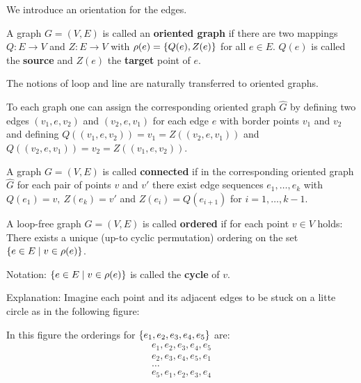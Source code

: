 We introduce an orientation for the edges. 

\begin{definition}
A graph $G = (V,E)$ is called an {\bf oriented graph} if there are two mappings
$Q : E \to V$ and $Z : E \to V$ with $\rho(e) = \mbox{$\{Q(e), Z(e)\}$}$ for all $e
\in E$.
$Q(e)$ is called the {\bf source} and $Z(e)$ the {\bf target} point of $e$.
\end{definition}


The notions of loop and line are naturally transferred to oriented graphs.

To each graph one can assign the corresponding oriented graph $\hat{G}$ by
defining two edges $(v_1,e,v_2)$ and $(v_2,e,v_1)$ for each edge $e$ with
border points $v_1$ and $v_2$ and defining $Q((v_1,e,v_2)) = v_1 =
Z((v_2,e,v_1))$ and $Q((v_2,e,v_1)) = v_2 = Z((v_1,e,v_2))$.

\begin{definition}
A graph $G = (V,E)$ is called {\bf connected} if in the corresponding oriented
graph $\hat{G}$ for each pair of points $v$ and $v'$ there exist edge sequences
$e_1, \ldots, e_k$ with $Q(e_1) = v,\ Z(e_k) = v'$ and $Z(e_i) = Q(e_{i+1})$ for
$i = 1, \ldots, k-1$.
\end{definition}

\begin{definition}
A loop-free graph $G = (V,E)$ is called {\bf ordered} if for each point $v \in
V$ holds: There exists a unique (up-to cyclic permutation) ordering on the set
$\mbox{$\{e \in E \mid v \in \rho(e)\}$}$.
\end{definition}

Notation: $\mbox{$\{e \in E \mid v \in \rho(e)\}$}$ is called the {\bf cycle} of
$v$.

Explanation: Imagine each point and its adjacent edges to be stuck on a litte
circle as in the following figure:

\begin{center}

\end{center}

In this figure the orderings for $\mbox{$\{e_1,e_2,e_3,e_4,e_5\}$}$ are:
\begin{eqnarray*}
& e_1, e_2, e_3, e_4, e_5 \\
& e_2, e_3, e_4, e_5, e_1 \\
& \ldots & \\
& e_5, e_1, e_2, e_3, e_4
\end{eqnarray*}

